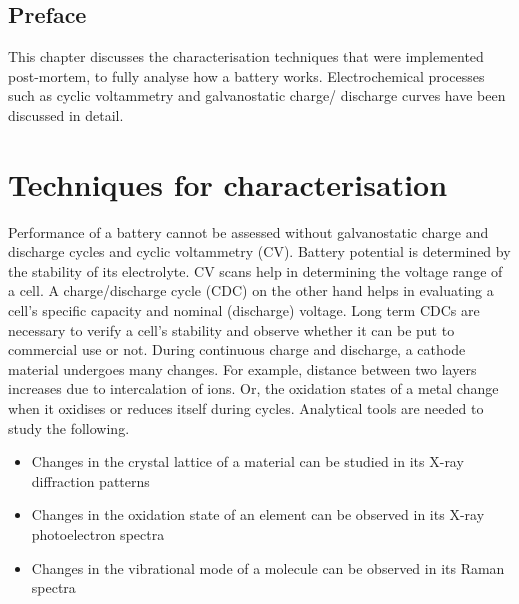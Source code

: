 \section*{\centering Preface}
This chapter discusses the characterisation techniques that were implemented post-mortem, to fully analyse how a battery works. Electrochemical processes such as cyclic voltammetry and galvanostatic charge/ discharge curves have been discussed in detail.   

\pagebreak

\chapter{Techniques for characterisation} %

\label{chap2} %

Performance of a battery cannot be assessed without galvanostatic charge and discharge cycles and cyclic voltammetry (CV). Battery potential is determined by the stability of its electrolyte. CV scans help in determining the voltage range of a cell. A charge/discharge cycle (CDC) on the other hand helps in evaluating a cell's specific capacity and nominal (discharge) voltage. Long term CDCs are necessary to verify a cell's stability and observe whether it can be put to commercial use or not. 
During continuous charge and discharge, a cathode material undergoes many changes. For example, distance between two layers increases due to intercalation of ions. Or, the oxidation states of a metal change when it oxidises or reduces itself during cycles. Analytical tools are needed to study the following. 

\begin{itemize}
    \item Changes in the crystal lattice of a material can be studied in its X-ray diffraction patterns 
    \item Changes in the oxidation state of an element can be observed in its X-ray photoelectron spectra
    \item Changes in the vibrational mode of a molecule can be observed in its Raman spectra 
\end{itemize}

